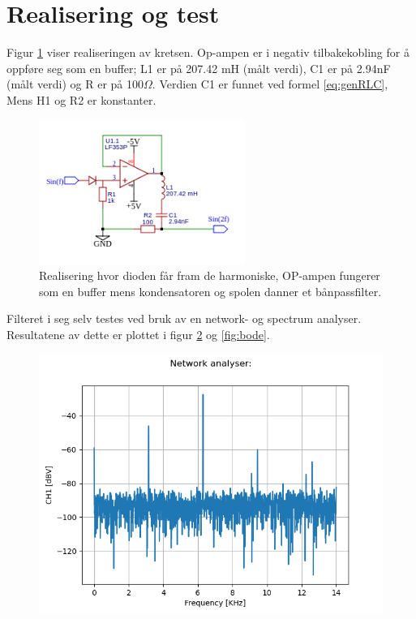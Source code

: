 \documentclass[a4paper,11pt,norsk]{article}
\begin{document}
\section{Realisering og test}
\label{sec:realisering}

Figur \ref{fig:Multiplikator} viser realiseringen av kretsen. Op-ampen er i negativ tilbakekobling for å oppføre seg som en buffer; L1 er på 207.42 mH (målt verdi), C1 er på 2.94nF (målt verdi) og R er på 100${\Omega}$. Verdien C1 er funnet ved formel \ref{eq:genRLC}, Mens H1 og R2 er konstanter.



\begin{figure}[H]
  \centering

  \includegraphics[width=0.6\textwidth]{SchematicCRKT.png} 

  \caption{Realisering hvor dioden får fram de harmoniske, OP-ampen fungerer som en buffer mens kondensatoren og spolen danner et bånpassfilter.}
  \label{fig:Multiplikator}
\end{figure}

Filteret i seg selv testes ved bruk av en network- og spectrum analyser. Resultatene av dette er plottet i figur \ref{fig:netwok} og \ref{fig:bode}.

\begin{figure}[H]
  \centering
  \includegraphics[width=1\textwidth]{network.png} 
  \caption{}
  \label{fig:netwok}
\end{figure}
\end{document}
